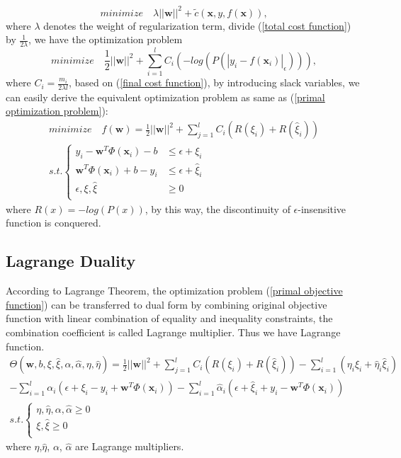 \documentclass[12pt, draftclsnofoot, onecolumn]{IEEEtran}
\begin{document}
\begin{spacing}{2}
\begin{equation}
minimize\quad \lambda||\mathbf{w}||^{2}+\tilde{c}(\mathbf{x}, y, f(\mathbf{x})),
\label{total cost function}
\end{equation} 
where $\lambda$ denotes the weight of regularization term, divide (\ref{total cost function}) by $\frac{1}{2\lambda}$, we have the optimization problem  
\begin{equation}
minimize \quad \frac{1}{2}||\mathbf{w}||^{2}+\sum_{i=1}^{l}C_{i}(-log(P(|y_{i}-f(\mathbf{x}_{i})|_{\epsilon}))),
\label{final cost function}
\end{equation}
where $C_{i}=\frac{m_{i}}{2\lambda l}$, based on (\ref{final cost function}), by introducing slack variables, we can easily derive the equivalent optimization problem as same as (\ref{primal optimization problem}):
\begin{eqnarray}
\nonumber
minimize \quad f(\mathbf{w})=\frac{1}{2}||\mathbf{w}||^{2}+\sum_{j=1}^{l}C_{i}(R(\xi_{i})+R(\hat{\xi}_{i}))\\
s.t. \left\{\begin{array}{ll}
y_{i}-\mathbf{w}^{T}\Phi(\mathbf{x}_{i})-b &\leq \epsilon+\xi_{i}\\
\mathbf{w}^{T}\Phi(\mathbf{x}_{i})+b-y_{i} &\leq \epsilon+\hat{\xi}_{i}\\
\epsilon, \xi,\hat{\xi} &\geq 0\\
\end{array}\right.
\label{primal objective function}
\end{eqnarray}
where $R(x)=-log(P(x))$, by this way, the discontinuity of $\epsilon$-insensitive function is conquered. 
\subsection{Lagrange Duality}\label{section lagrange duality}
According to Lagrange Theorem, the optimization problem (\ref{primal objective function}) can be transferred to dual form by combining original objective function with linear combination of equality and inequality constraints, the combination coefficient is called Lagrange multiplier. Thus we have Lagrange function. 
\begin{eqnarray}
\nonumber
\Theta(\mathbf{w}, b, \xi, \hat{\xi}, \alpha, \hat{\alpha}, \eta, \hat{\eta})=
\frac{1}{2}||\mathbf{w}||^{2}+\sum_{j=1}^{l}C_{i}(R(\xi_{i})+R(\hat{\xi}_{i}))-\sum_{i=1}^{l}(\eta_{i}\xi_{i}+\hat{\eta}_{i}\hat{\xi}_{i})\\
\nonumber
-\sum_{i=1}^{l}\alpha_{i}(\epsilon+\xi_{i}-y_{i}+\mathbf{w}^{T}\Phi(\mathbf{x}_{i}))-\sum_{i=1}^{l}\hat{\alpha}_{i}(\epsilon+\hat{\xi}_{i}+y_{i}-\mathbf{w}^{T}\Phi(\mathbf{x}_{i}))\\
s.t. \left\{\begin{array}{cc}
\eta, \hat{\eta}, \alpha, \hat{\alpha}\geq 0\\
\xi, \hat{\xi}\geq  0\\
\end{array}\right.
\label{lagrange duality1}
\end{eqnarray}
where $\eta$,$\hat{\eta}$, $\alpha$, $\hat{\alpha}$ are Lagrange multipliers.


\end{spacing}
\end{document}
